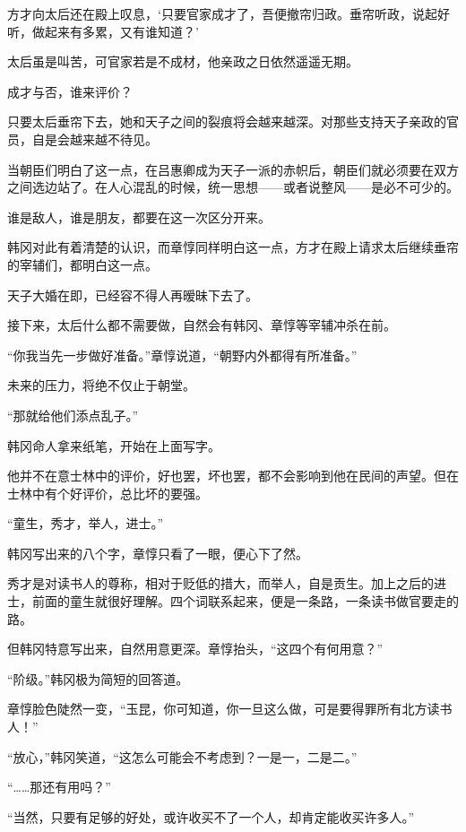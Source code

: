 方才向太后还在殿上叹息，‘只要官家成才了，吾便撤帘归政。垂帘听政，说起好听，做起来有多累，又有谁知道？’

太后虽是叫苦，可官家若是不成材，他亲政之日依然遥遥无期。

成才与否，谁来评价？

只要太后垂帘下去，她和天子之间的裂痕将会越来越深。对那些支持天子亲政的官员，自是会越来越不待见。

当朝臣们明白了这一点，在吕惠卿成为天子一派的赤帜后，朝臣们就必须要在双方之间选边站了。在人心混乱的时候，统一思想——或者说整风——是必不可少的。

谁是敌人，谁是朋友，都要在这一次区分开来。

韩冈对此有着清楚的认识，而章惇同样明白这一点，方才在殿上请求太后继续垂帘的宰辅们，都明白这一点。

天子大婚在即，已经容不得人再暧昧下去了。

接下来，太后什么都不需要做，自然会有韩冈、章惇等宰辅冲杀在前。

“你我当先一步做好准备。”章惇说道，“朝野内外都得有所准备。”

未来的压力，将绝不仅止于朝堂。

“那就给他们添点乱子。”

韩冈命人拿来纸笔，开始在上面写字。

他并不在意士林中的评价，好也罢，坏也罢，都不会影响到他在民间的声望。但在士林中有个好评价，总比坏的要强。

“童生，秀才，举人，进士。”

韩冈写出来的八个字，章惇只看了一眼，便心下了然。

秀才是对读书人的尊称，相对于贬低的措大，而举人，自是贡生。加上之后的进士，前面的童生就很好理解。四个词联系起来，便是一条路，一条读书做官要走的路。

但韩冈特意写出来，自然用意更深。章惇抬头，“这四个有何用意？”

“阶级。”韩冈极为简短的回答道。

章惇脸色陡然一变，“玉昆，你可知道，你一旦这么做，可是要得罪所有北方读书人！”

“放心，”韩冈笑道，“这怎么可能会不考虑到？一是一，二是二。”

“……那还有用吗？”

“当然，只要有足够的好处，或许收买不了一个人，却肯定能收买许多人。”
